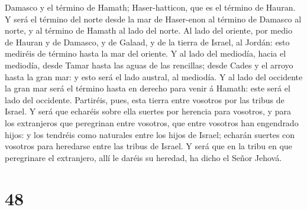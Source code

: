 Damasco y el término de Hamath; Haser-hatticon, que es el término de
Hauran.  Y será el término del norte desde la mar de
Haser-enon al término de Damasco al norte, y al término de Hamath al
lado del norte.  Al lado del oriente, por medio de Hauran y
de Damasco, y de Galaad, y de la tierra de Israel, al Jordán: esto
mediréis de término hasta la mar del oriente.  Y al lado
del mediodía, hacia el mediodía, desde Tamar hasta las aguas de las
rencillas; desde Cades y el arroyo hasta la gran mar: y esto será el
lado austral, al mediodía.  Y al lado del occidente la gran
mar será el término hasta en derecho para venir á Hamath: este será el
lado del occidente.  Partiréis, pues, esta tierra entre
vosotros por las tribus de Israel.  Y será que echaréis
sobre ella suertes por herencia para vosotros, y para los extranjeros
que peregrinan entre vosotros, que entre vosotros han engendrado hijos:
y los tendréis como naturales entre los hijos de Israel; echarán suertes
con vosotros para heredarse entre las tribus de Israel.  Y
será que en la tribu en que peregrinare el extranjero, allí le daréis su
heredad, ha dicho el Señor Jehová.

\hypertarget{section-47}{%
\section{48}\label{section-47}}

